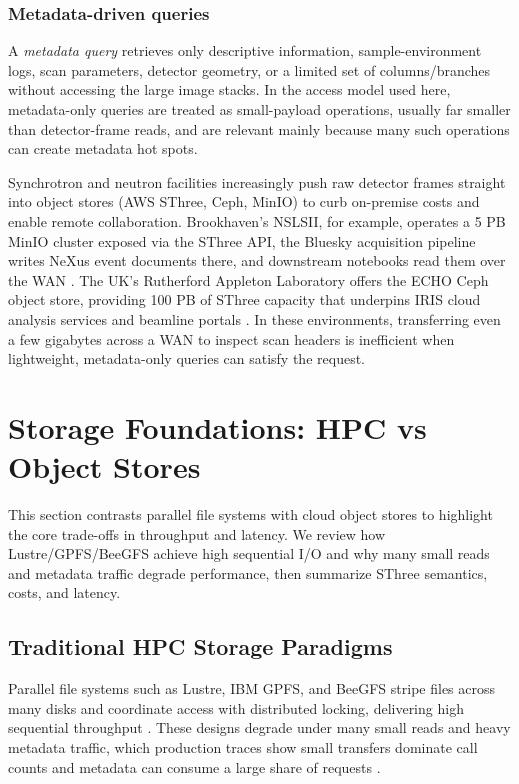 \documentclass[nomenclature, english, bibtex]{kththesis}
\numberwithin{listing}{chapter}
\begin{document}
\subsubsection{Metadata-driven queries}
A \emph{metadata query} retrieves only descriptive information, sample-environment logs, scan parameters, detector geometry, or a limited set of columns/branches without accessing the large image stacks. In the access model used here, metadata-only queries are treated as small-payload operations, usually far smaller than detector-frame reads, and are relevant mainly because many such operations can create metadata hot spots.

Synchrotron and neutron facilities increasingly push raw detector frames straight into object stores (\gls{AWS} \gls{SThree}, \gls{Ceph}, \gls{MinIO}) to curb on-premise costs and enable remote collaboration. Brookhaven’s \gls{NSLSII}, for example, operates a {\small 5 PB} \gls{MinIO} cluster exposed via the \gls{SThree} \gls{API}, the Bluesky acquisition pipeline writes NeXus event documents there, and downstream notebooks read them over the \gls{WAN} \cite{Lancon2022}. The UK’s Rutherford Appleton Laboratory offers the \gls{ECHO} \gls{Ceph} object store, providing {\small 100 PB} of \gls{SThree} capacity that underpins \gls{IRIS} cloud analysis services and beamline portals \cite{ECHO2025}. In these environments, transferring even a few gigabytes across a \gls{WAN} to inspect scan headers is inefficient when lightweight, metadata-only queries can satisfy the request.


\section{Storage Foundations: HPC vs Object Stores}
\label{sec:storage-foundations}
This section contrasts parallel file systems with cloud object stores to highlight the core trade-offs in throughput and latency. We review how Lustre/\gls{GPFS}/\gls{BeeGFS} achieve high sequential I/O and why many small reads and metadata traffic degrade performance, then summarize \gls{SThree} semantics, costs, and latency.

\subsection{Traditional HPC Storage Paradigms}
\label{sec:traditional-hpc-storage-paradigms}
Parallel file systems such as Lustre, IBM \gls{GPFS}, and \gls{BeeGFS} stripe files across many disks and coordinate access with distributed locking, delivering high sequential throughput \cite{schwan2003lustre,schmuck2002gpfs}. These designs degrade under many small reads and heavy metadata traffic, which production traces show small transfers dominate call counts and metadata can consume a large share of requests \cite{bez2022access}.
\end{document}
